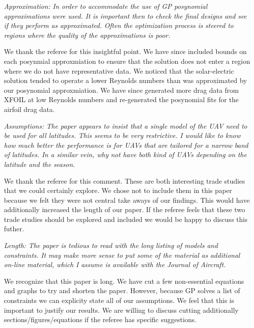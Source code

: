 \documentclass[10pt, a4paper]{article}
\begin{document}
\emph{Approximation: In order to accommodate the use of GP posynomial approximations were used. It is important then to check the final designs and see if they perform as approximated. Often the optimization process is steered to regions where the quality of the approximations is poor.}

We thank the referee for this insightful point.  We have since included bounds on each posynmial approxmiation to ensure that the solution does not enter a region where we do not have representative data.  We noticed that the solar-electric solution tended to operate a lower Reynolds numbers than was approximated by our posynomial approxmiation.  We have since generated more drag data from XFOIL at low Reynolds numbers and re-generated the posynomial fits for the airfoil drag data.

\emph{Assumptions:
The paper appears to insist that a single model of the UAV need to be used for all latitudes. This seems to be very restrictive. I would like to know how much better the performance is for UAVs that are tailored for a narrow band of latitudes.
In a similar vein, why not have both kind of UAVs depending on the latitude and the season.
}

We thank the referee for this comment.  These are both interesting trade studies that we could certainly explore.  We chose not to include them in this paper because we felt they were not central take aways of our findings.  This would have additionally increased the length of our paper.  If the referee feels that these two trade studies should be explored and included we would be happy to discuss this futher.

\emph{Length: The paper is tedious to read with the long listing of models and constraints. It may make more sense to put some of the material as additional on-line material, which I assume is available with the Journal of Aircraft.}

We recognize that this paper is long.  We have cut a few non-essential equations and graphs to try and shorten the paper.  However, because GP solves a list of constraints we can explicity state all of our assumptions.  We feel that this is important to justify our results.  We are willing to discuss cutting additionally sections/figures/equations if the referee has specific suggestions.
\end{document}
